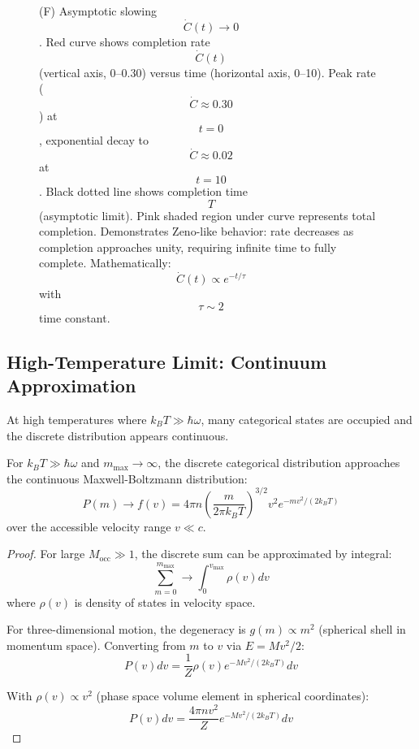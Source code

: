 \begin{definition}
\begin{figure}[htbp]
{        (F) Asymptotic slowing $$\dot{C}(t) \to 0$$. Red curve shows completion rate $$\dot{C}(t)$$ (vertical axis, 0--0.30) versus time (horizontal axis, 0--10). Peak rate ($$\dot{C} \approx 0.30$$) at $$t = 0$$, exponential decay to $$\dot{C} \approx 0.02$$ at $$t = 10$$. Black dotted line shows completion time $$T$$ (asymptotic limit). Pink shaded region under curve represents total completion. Demonstrates Zeno-like behavior: rate decreases as completion approaches unity, requiring infinite time to fully complete. Mathematically: $$\dot{C}(t) \propto e^{-t/\tau}$$ with $$\tau \sim 2$$ time constant.}
        \label{fig:topology_categorical_spaces}
        \end{figure}


\subsection{High-Temperature Limit: Continuum Approximation}

At high temperatures where $k_BT \gg \hbar\omega$, many categorical states are occupied and the discrete distribution appears continuous.

\begin{theorem}
\label{thm:continuum_limit}
For $k_BT \gg \hbar\omega$ and $m_{\max} \to \infty$, the discrete categorical distribution approaches the continuous Maxwell-Boltzmann distribution:
\begin{equation}
P(m) \to f(v) = 4\pi n \left(\frac{m}{2\pi k_BT}\right)^{3/2} v^2 e^{-mv^2/(2k_BT)}
\end{equation}
over the accessible velocity range $v \ll c$.
\end{theorem}

\begin{proof}
For large $M_{\text{occ}} \gg 1$, the discrete sum can be approximated by integral:
\begin{equation}
\sum_{m=0}^{m_{\max}} \to \int_0^{v_{\max}} \rho(v) dv
\end{equation}
where $\rho(v)$ is density of states in velocity space.

For three-dimensional motion, the degeneracy is $g(m) \propto m^2$ (spherical shell in momentum space). Converting from $m$ to $v$ via $E = Mv^2/2$:
\begin{equation}
P(v) dv = \frac{1}{Z} \rho(v) e^{-Mv^2/(2k_BT)} dv
\end{equation}

With $\rho(v) \propto v^2$ (phase space volume element in spherical coordinates):
\begin{equation}
P(v) dv = \frac{4\pi n v^2}{Z} e^{-Mv^2/(2k_BT)} dv
\end{equation}


\end{proof}
\end{definition}
